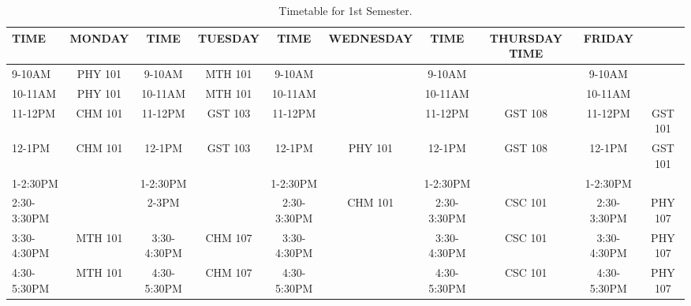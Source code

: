 \documentclass{article}
\begin{document}
\begin{sidewaystable}[h!]
	\begin{center}
		\caption{Timetable for 1st Semester.}
		\label{tab:table1}
		\begin{tabular}{l|S|c|c|c|c|c|c|c|c}
			\hline
			\textbf{TIME} & \textbf{MONDAY} & \textbf{TIME} & \textbf{TUESDAY} & \textbf{TIME} & \textbf{WEDNESDAY} & \textbf{TIME} & \textbf{THURSDAY} \textbf{TIME} & \textbf{FRIDAY}\\
			\hline
			9-10AM & PHY 101 & 9-10AM & MTH 101 & 9-10AM & & 9-10AM & & 9-10AM & \\
			10-11AM & PHY 101 & 10-11AM & MTH 101 & 10-11AM & & 10-11AM & & 10-11AM & \\
			11-12PM & CHM 101 & 11-12PM & GST 103 & 11-12PM & & 11-12PM & GST 108 & 11-12PM & GST 101\\
			12-1PM & CHM 101 & 12-1PM & GST 103 & 12-1PM & PHY 101 & 12-1PM & GST 108 & 12-1PM & GST 101\\	
			1-2:30PM & & 1-2:30PM &  & 1-2:30PM &  & 1-2:30PM &  & 1-2:30PM & \\
			2:30-3:30PM & & 2-3PM & & 2:30-3:30PM & CHM 101 & 2:30-3:30PM & CSC 101 & 2:30-3:30PM & PHY 107\\
			3:30-4:30PM & MTH 101 & 3:30-4:30PM & CHM 107 & 3:30-4:30PM & & 3:30-4:30PM & CSC 101 & 3:30-4:30PM & PHY 107\\	
			4:30-5:30PM & MTH 101 & 4:30-5:30PM & CHM 107 & 4:30-5:30PM & & 4:30-5:30PM & CSC 101 & 4:30-5:30PM & PHY 107\\
			\hline
	\end{tabular}	
	\end{center}
\end{sidewaystable}
\end{document}

